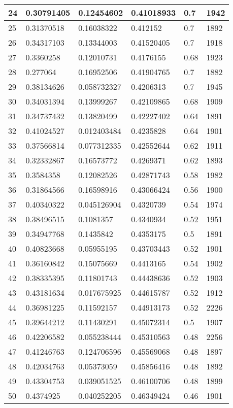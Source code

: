 \begin{longtable}{|l|l|l|l|l|l|}
24 & 0.30791405 & 0.12454602 & 0.41018933 & 0.7 & 1942 \\ \hline 
25 & 0.31370518 & 0.16038322 & 0.412152 & 0.7 & 1892 \\ \hline 
26 & 0.34317103 & 0.13344003 & 0.41520405 & 0.7 & 1918 \\ \hline 
27 & 0.3360258 & 0.12010731 & 0.4176155 & 0.68 & 1923 \\ \hline 
28 & 0.277064 & 0.16952506 & 0.41904765 & 0.7 & 1882 \\ \hline 
29 & 0.38134626 & 0.058732327 & 0.4206313 & 0.7 & 1945 \\ \hline 
30 & 0.34031394 & 0.13999267 & 0.42109865 & 0.68 & 1909 \\ \hline 
31 & 0.34737432 & 0.13820499 & 0.42227402 & 0.64 & 1891 \\ \hline 
32 & 0.41024527 & 0.012403484 & 0.4235828 & 0.64 & 1901 \\ \hline 
33 & 0.37566814 & 0.077312335 & 0.42552644 & 0.62 & 1911 \\ \hline 
34 & 0.32332867 & 0.16573772 & 0.4269371 & 0.62 & 1893 \\ \hline 
35 & 0.3584358 & 0.12082526 & 0.42871743 & 0.58 & 1982 \\ \hline 
36 & 0.31864566 & 0.16598916 & 0.43066424 & 0.56 & 1900 \\ \hline 
37 & 0.40340322 & 0.045126904 & 0.4320739 & 0.54 & 1974 \\ \hline 
38 & 0.38496515 & 0.1081357 & 0.4340934 & 0.52 & 1951 \\ \hline 
39 & 0.34947768 & 0.1435842 & 0.4353175 & 0.5 & 1891 \\ \hline 
40 & 0.40823668 & 0.05955195 & 0.43703443 & 0.52 & 1901 \\ \hline 
41 & 0.36160842 & 0.15075669 & 0.4413165 & 0.54 & 1902 \\ \hline 
42 & 0.38335395 & 0.11801743 & 0.44438636 & 0.52 & 1903 \\ \hline 
43 & 0.43181634 & 0.017675925 & 0.44615787 & 0.52 & 1912 \\ \hline 
44 & 0.36981225 & 0.11592157 & 0.44913173 & 0.52 & 2226 \\ \hline 
45 & 0.39644212 & 0.11430291 & 0.45072314 & 0.5 & 1907 \\ \hline 
46 & 0.42206582 & 0.055238444 & 0.45310563 & 0.48 & 2256 \\ \hline 
47 & 0.41246763 & 0.124706596 & 0.45569068 & 0.48 & 1897 \\ \hline 
48 & 0.42034763 & 0.05373059 & 0.45856416 & 0.48 & 1892 \\ \hline 
49 & 0.43304753 & 0.039051525 & 0.46100706 & 0.48 & 1899 \\ \hline 
50 & 0.4374925 & 0.040252205 & 0.46349424 & 0.46 & 1901 \\ \hline 
\end{longtable}
